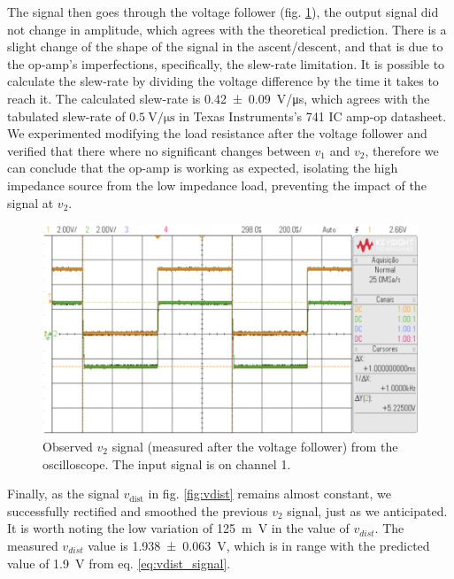 \documentclass[lettersize,journal]{IEEEtran}
\begin{document}
The signal then goes through the voltage follower (fig. \ref{fig:v2}), the output signal did not change in amplitude, which agrees with the theoretical prediction. There is a slight change of the shape of the signal in the ascent/descent, and that is due to the op-amp's imperfections, specifically, the slew-rate limitation. It is possible to calculate the slew-rate by dividing the voltage difference by the time it takes to reach it. The calculated slew-rate is \SI{0.42 \pm 0.09}{\volt / \us}, which agrees with the tabulated slew-rate of $\SI{0.5}{\volt / \us}$ in Texas Instruments's 741 IC amp-op datasheet.\\

We experimented modifying the load resistance after the voltage follower and verified that there where no significant changes between $v_1$ and $v_2$, therefore we can conclude that the op-amp is working as expected, isolating the high impedance source from the low impedance load, preventing the impact of the signal at $v_2$. 

\begin{figure}
    \centering
    \includegraphics[width=\linewidth]{images/v2_scope.png}
    \caption{Observed $v_2$ signal (measured after the voltage follower) from the oscilloscope. The input signal is on channel 1.}
    \label{fig:v2}
\end{figure}
\vspace{20pt}

Finally, as the signal \( v_{\text{dist}} \) in fig. \ref{fig:vdist} remains almost constant, we successfully rectified and smoothed the previous \( v_2 \) signal, just as we anticipated. It is worth noting the low variation of \SI{125}{\m \volt} in the value of $v_{dist}$. The measured $v_{dist}$ value is \SI{1.938 \pm 0.063}{\volt}, which is in range with the predicted value of \SI{1.9}{\volt} from eq. \ref{eq:vdist_signal}. 
\end{document}
